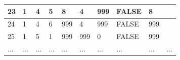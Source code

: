 \begin{table}[h!]
\begin{tabular}{|l|l|l|l|l|l|l|l|l|l|}
		23                                                          & 1                                                       & 4                                                       & 5                                                       & 8                                                                        & 4                                                                        & 999                                                                      & FALSE                                                           & 8                                                                        &                                                               \\ \hline
		24                                                          & 1                                                       & 4                                                       & 6                                                       & 999                                                                      & 4                                                                        & 999                                                                      & FALSE                                                           & 999                                                                      &                                                               \\ \hline
		25                                                          & 1                                                       & 5                                                       & 1                                                       & 999                                                                      & 999                                                                      & 0                                                                        & FALSE                                                           & 999                                                                      &                                                               \\ \hline
...
&...                                                        & ...                                                       & ...                                                       &     ...                                                                    & ...                                                                      & ...                                                                        &...                                                           & ...                                                                        &  ...                                                             \\ \hline

\end{tabular}
\end{table}
